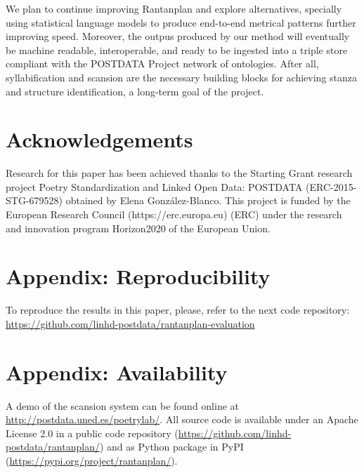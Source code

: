 \documentclass[a4paper,11pt,twocolumn,twoside]{article}
\begin{document}
We plan to continue improving Rantanplan and explore alternatives, specially using statistical language models to produce end-to-end metrical patterns further improving speed. Moreover, the outpus produced by our method will eventually be machine readable, interoperable, and ready to be ingested into a triple store compliant with the POSTDATA Project network of ontologies. After all, syllabification and scansion are the necessary building blocks for achieving stanza and structure identification, a long-term goal of the project.

\section*{Acknowledgements}
Research for this paper has been achieved thanks to the Starting Grant research project Poetry Standardization and Linked Open Data: POSTDATA (ERC-2015-STG-679528) obtained by Elena González-Blanco. This project is funded by the European Research Council (https://erc.europa.eu) (ERC) under the research and innovation program Horizon2020 of the European Union.




\section{Appendix: Reproducibility}
To reproduce the results in this paper, please, refer to the next code repository: \url{https://github.com/linhd-postdata/rantanplan-evaluation}

\section{Appendix: Availability}
A demo of the scansion system can be found online at \url{http://postdata.uned.es/poetrylab/}. All source code is available under an Apache License 2.0 in a public code repository (\url{https://github.com/linhd-postdata/rantanplan/}) and as Python package in PyPI (\url{https://pypi.org/project/rantanplan/}).
\end{document}
